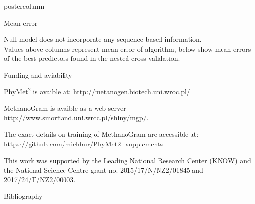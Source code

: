 \documentclass[final]{beamer}\usepackage[]{graphicx}\usepackage[]{color}
\newenvironment{knitrout}{}{} %
\newenvironment{knitrout}{}{} %
\begin{document}
\begin{frame}
\begin{columns}
\begin{column}{.48\textwidth}
\begin{beamercolorbox}[center,wd=\textwidth]{postercolumn}
\begin{minipage}[T]{.95\textwidth}
{\begin{block}{Mean error}
\begin{knitrout}
{}



\end{knitrout}

% 
% 
% 
% 
% 

Null model does not incorporate any sequence-based information. \\
Values above columns represent mean error of algorithm, below show mean errors of the best predictors found in the nested cross-validation.


\end{block}
\vfill


\begin{block}{Funding and aviability}

PhyMet$^2$ is avaible at: \url{http://metanogen.biotech.uni.wroc.pl/}.

\bigskip

MethanoGram is avaible as a web-server: \url{http://www.smorfland.uni.wroc.pl/shiny/mgp/}.

\bigskip

The exact details on training of MethanoGram are accessible at: \url{https://github.com/michbur/PhyMet2_supplements}.
\bigskip


\small{This work was supported by the Leading National Research Center (KNOW) and the National Science Centre grant no. 2015/17/N/NZ2/01845 and 2017/24/T/NZ2/00003.}
\nocite{jablonski_methanogenic_2015}


\end{block}
\vfill

 \begin{block}{Bibliography}
  \tiny{
  
  
  }
  \end{block}
  \vfill  


}
\end{minipage}
\end{beamercolorbox}
\end{column}
\end{columns}  
\end{frame}
\end{document}
